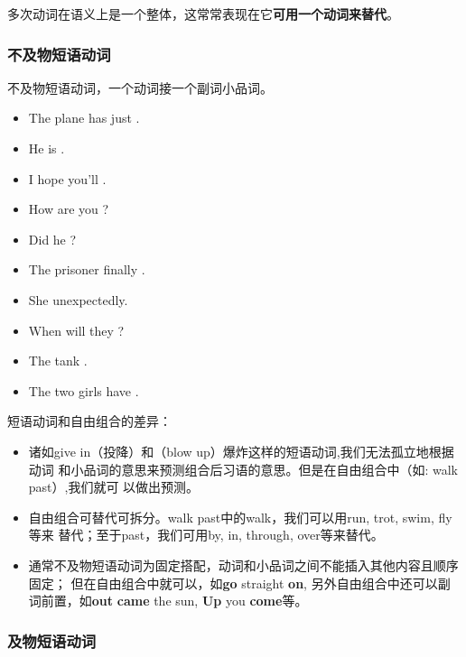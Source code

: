 多次动词在语义上是一个整体，这常常表现在它\textbf{可用一个动词来替代}。
\subsubsection{不及物短语动词}

不及物短语动词，一个动词接一个副词小品词。
\begin{itemize}
\item The plane has just .
\item He is .
\item I hope you'll .
\item How are you ?
\item Did he ?
\item The prisoner finally .
\item She  unexpectedly.
\item When will they ?
\item The tank .
\item The two girls have .

\end{itemize}

短语动词和自由组合的差异：
\begin{itemize}
\item 诸如give in（投降）和（blow up）爆炸这样的短语动词,我们无法孤立地根据动词
和小品词的意思来预测组合后习语的意思。但是在自由组合中（如: walk past）,我们就可
以做出预测。

\item 自由组合可替代可拆分。walk past中的walk，我们可以用run, trot, swim, fly等来
替代；至于past，我们可用by, in, through, over等来替代。


\item 通常不及物短语动词为固定搭配，动词和小品词之间不能插入其他内容且顺序固定；
但在自由组合中就可以，如\textbf{go} straight \textbf{on}, 另外自由组合中还可以副
词前置，如\textbf{out} \textbf{came} the sun, \textbf{Up} you \textbf{come}等。

\end{itemize}

\subsubsection{及物短语动词}

